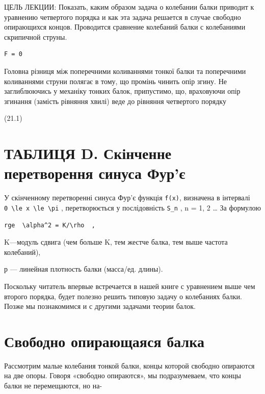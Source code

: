 \documentclass[
  ukrainian,
]{article}
\begin{document}
ЦЕЛЬ ЛЕКЦИИ: Показать, каким образом задача о колебании балки приводит к
уравнению четвертого порядка и как эта задача решается в случае свободно
опирающихся концов. Проводится сравнение колебаний балки с колебаниями
скрипичной струны.

\begin{verbatim}
F = 0
\end{verbatim}

Головна різниця між поперечними коливаннями тонкої балки та поперечними
коливаннями струни полягає в тому, що промінь чинить опір згину. Не
заглиблюючись у механіку тонких балок, припустимо, що, враховуючи опір
згинання (замість рівняння хвилі) веде до рівняння четвертого порядку

(21.1)

\section{ТАБЛИЦЯ D. Скінченне перетворення синуса
Фур'є}\label{ux442ux430ux431ux43bux438ux446ux44f-d.-ux441ux43aux456ux43dux447ux435ux43dux43dux435-ux43fux435ux440ux435ux442ux432ux43eux440ux435ux43dux43dux44f-ux441ux438ux43dux443ux441ux430-ux444ux443ux440ux454}

У скінченному перетворенні синуса Фур'є функція \texttt{f(x)}, визначена
в інтервалі
\texttt{0\ \textbackslash{}le\ x\ \textbackslash{}le\ \textbackslash{}pi}
, перетворюється у послідовність \texttt{S\_n} , n = 1, 2 \ldots{} За
формулою

\begin{verbatim}
rge  \alpha^2 = K/\rho  ,
\end{verbatim}

K---модуль сдвига (чем больше K, тем жестче балка, тем выше частота
колебаний),

р --- линейная плотность балки (масса/ед. длины).

Поскольку читатель впервые встречается в нашей книге с уравнением выше
чем второго порядка, будет полезно решить типовую задачу о колебаниях
балки. Позже мы познакомимся и с другими задачами теории балок.

\section{Свободно опирающаяся
балка}\label{ux441ux432ux43eux431ux43eux434ux43dux43e-ux43eux43fux438ux440ux430ux44eux449ux430ux44fux441ux44f-ux431ux430ux43bux43aux430}

Рассмотрим малые колебания тонкой балки, концы которой свободно
опираются на две опоры. Говоря «свободно опираются», мы подразумеваем,
что концы балки не перемещаются, но на-
\end{document}
